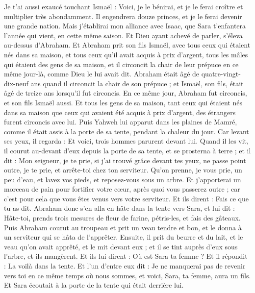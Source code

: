 \begin{multicols}{2}
Je t'ai aussi exaucé touchant Ismaël : Voici, je le bénirai, et je le ferai croître et multiplier très abondamment. Il engendrera douze princes, et je le ferai devenir une grande nation.
Mais j'établirai mon alliance avec Isaac, que Sara t'enfantera l'année qui vient, en cette même saison.
Et Dieu ayant achevé de parler, s'éleva au-dessus d'Abraham.
Et Abraham prit son fils Ismaël, avec tous ceux qui étaient nés dans sa maison, et tous ceux qu'il avait acquis à prix d'argent, tous les mâles qui étaient des gens de sa maison, et il circoncit la chair de leur prépuce en ce même jour-là, comme Dieu le lui avait dit.
Abraham était âgé de quatre-vingt-dix-neuf ans quand il circoncit la chair de son prépuce ;
et Ismaël, son fils, était âgé de treize ans lorsqu'il fut circoncis.
En ce même jour, Abraham fut circoncis, et son fils Ismaël aussi.
Et tous les gens de sa maison, tant ceux qui étaient nés dans sa maison que ceux qui avaient été acquis à prix d'argent, des étrangers furent circoncis avec lui.
\VerseOne{}Puis Yahweh lui apparut dans les plaines de Mamré, comme il était assis à la porte de sa tente, pendant la chaleur du jour.
Car levant ses yeux, il regarda : Et voici, trois hommes parurent devant lui. Quand il les vit, il courut au-devant d'eux depuis la porte de sa tente, et se prosterna à terre ;
et il dit : Mon seigneur, je te prie, si j'ai trouvé grâce devant tes yeux, ne passe point outre, je te prie, et arrête-toi chez ton serviteur.
Qu'on prenne, je vous prie, un peu d'eau, et lavez vos pieds, et reposez-vous sous un arbre.
Et j'apporterai un morceau de pain pour fortifier votre cœur, après quoi vous passerez outre ; car c'est pour cela que vous êtes venus vers votre serviteur. Et ils dirent : Fais ce que tu as dit.
Abraham donc s'en alla en hâte dans la tente vers Sara, et lui dit : Hâte-toi, prends trois mesures de fleur de farine, pétris-les, et fais des gâteaux.
Puis Abraham courut au troupeau et prit un veau tendre et bon, et le donna à un serviteur qui se hâta de l'apprêter.
Ensuite, il prit du beurre et du lait, et le veau qu'on avait apprêté, et le mit devant eux ; et il se tint auprès d'eux sous l'arbre, et ils mangèrent.
Et ils lui dirent : Où est Sara ta femme ? Et il répondit : La voilà dans la tente.
Et l'un d'entre eux dit : Je ne manquerai pas de revenir vers toi en ce même temps où nous sommes, et voici, Sara, ta femme, aura un fils. Et Sara écoutait à la porte de la tente qui était derrière lui.

\end{multicols}
